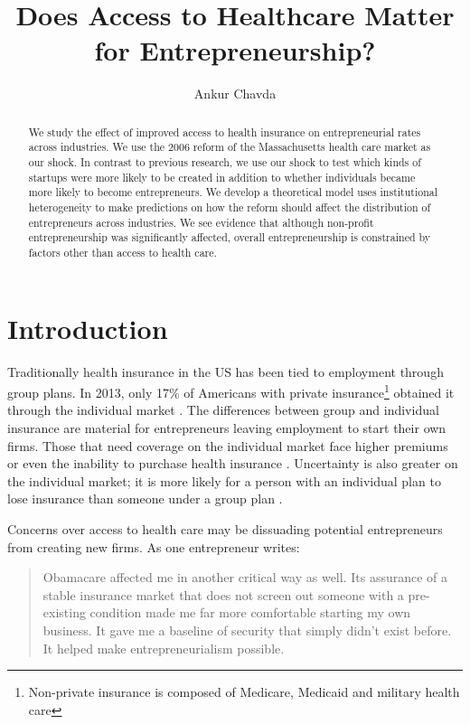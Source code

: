 \documentclass[12pt]{article}
\title{Does Access to Healthcare Matter for Entrepreneurship?}
\author{Ankur Chavda}
\begin{document}
\maketitle

\begin{abstract}
We study the effect of improved access to health insurance on entrepreneurial rates across industries. We use the 2006 reform of the Massachusetts health care market as our shock. In contrast to previous research, we use our shock to test which kinds of startups were more likely to be created in addition to whether individuals became more likely to become entrepreneurs.  We develop a theoretical model uses institutional heterogeneity to make predictions on how the reform should affect the distribution of entrepreneurs across industries. We see evidence that although non-profit entrepreneurship was significantly affected, overall entrepreneurship is constrained by factors other than access to health care. 
\end{abstract}


\section{Introduction}
Traditionally health insurance in the US has been tied to employment through group plans. In 2013, only 17\% of Americans with private insurance\footnote{Non-private insurance is composed of Medicare, Medicaid and military health care} obtained it through the individual market \cite{census}. The differences between group and individual insurance are material for entrepreneurs leaving employment to start their own firms. Those that need coverage on the individual market face higher premiums or even the inability to purchase health insurance \cite{kaiser}. Uncertainty is also greater on the individual market; it is more likely for a person with an individual plan to lose insurance than someone under a group plan \cite{pauly}. 

Concerns over access to health care may be dissuading potential entrepreneurs from creating new firms. As one entrepreneur writes:
\begin{quote}
Obamacare affected me in another critical way as well. Its assurance of a stable insurance market that does not screen out someone with a pre-existing condition made me far more comfortable starting my own business. It gave me a baseline of security that simply didn't exist before. It helped make entrepreneurialism possible. \cite{sullivan}
\end{quote}
\end{document}
